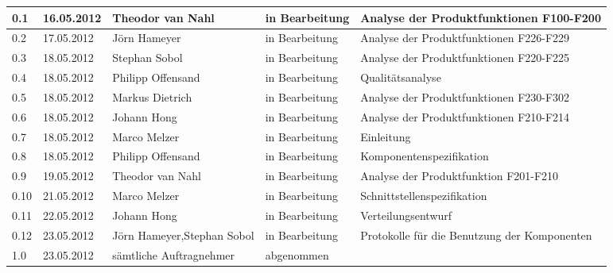 \begin{longtable}{|m{1.78cm}|m{1.59cm}|m{2.86cm}|m{1.9cm}|m{5.25cm}|}
  0.1   &    16.05.2012    &    Theodor van Nahl    &   in Bearbeitung     &    Analyse der Produktfunktionen F100-F200\\       %
  \hline                                              %
  0.2   &    17.05.2012    &    Jörn Hameyer    &   in Bearbeitung     &    Analyse der Produktfunktionen F226-F229\\       %
  \hline
  0.3   &    18.05.2012    &    Stephan Sobol    &   in Bearbeitung     &    Analyse der Produktfunktionen F220-F225\\       %
  \hline
  0.4   &    18.05.2012    &    Philipp \mbox{Offensand}    &   in Bearbeitung     &    Qualitätsanalyse\\       %
  \hline
  0.5   &    18.05.2012    &    Markus Dietrich    &   in Bearbeitung     &    Analyse der Produktfunktionen F230-F302\\       %
  \hline
  0.6   &    18.05.2012    &    Johann Hong    &   in Bearbeitung     &    Analyse der Produktfunktionen F210-F214\\       %
  \hline
  0.7   &    18.05.2012    &    Marco Melzer    &   in Bearbeitung     &    Einleitung\\       %
  \hline
  0.8   &    18.05.2012    &    Philipp \mbox{Offensand}    &   in Bearbeitung     &    Komponentenspezifikation\\       %
  \hline
  0.9   &    19.05.2012    &    Theodor van Nahl    &   in Bearbeitung     &    Analyse der Produktfunktion F201-F210\\       %
  \hline
  0.10   &   21.05.2012    &    Marco Melzer    &   in Bearbeitung     &    Schnittstellenspezifikation\\       %
  \hline
  0.11   &   22.05.2012    &    Johann Hong    &   in Bearbeitung     &    Verteilungsentwurf\\       %
  \hline
  0.12   &   23.05.2012    &    Jörn Hameyer,\newline Stephan Sobol    &   in Bearbeitung     &    Protokolle für die Benutzung der Komponenten\\       %
  \hline
  1.0   &    23.05.2012    &    sämtliche Auftragnehmer    &   abgenommen     &    \\       %
  \hline
  

\end{longtable}

